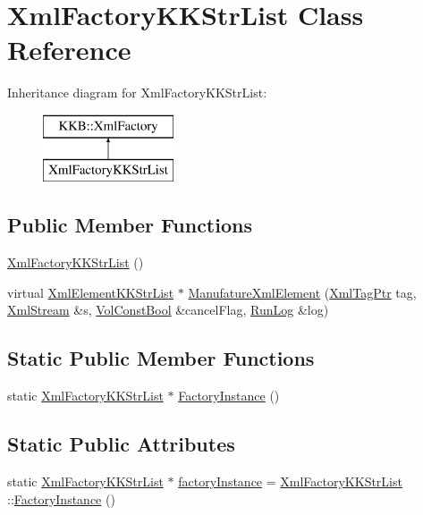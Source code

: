 \hypertarget{class_xml_factory_k_k_str_list}{}\section{Xml\+Factory\+K\+K\+Str\+List Class Reference}
\label{class_xml_factory_k_k_str_list}
Inheritance diagram for Xml\+Factory\+K\+K\+Str\+List\+:\begin{figure}[H]
\begin{center}
\leavevmode
\includegraphics[height=2.000000cm]{class_xml_factory_k_k_str_list}
\end{center}
\end{figure}
\subsection*{Public Member Functions}
\begin{DoxyCompactItemize}
\item 
\hyperlink{class_xml_factory_k_k_str_list_aac3ccf121c8bf683ca94dc3bd014f06f}{Xml\+Factory\+K\+K\+Str\+List} ()
\item 
virtual \hyperlink{namespace_k_k_b_a200e36b6739def59860c742eb8168484}{Xml\+Element\+K\+K\+Str\+List} $\ast$ \hyperlink{class_xml_factory_k_k_str_list_a39a3275bccfcde2cc5fb59047565eff1}{Manufature\+Xml\+Element} (\hyperlink{namespace_k_k_b_a9253a3ea8a5da18ca82be4ca2b390ef0}{Xml\+Tag\+Ptr} tag, \hyperlink{class_k_k_b_1_1_xml_stream}{Xml\+Stream} \&s, \hyperlink{namespace_k_k_b_a7d390f568e2831fb76b86b56c87bf92f}{Vol\+Const\+Bool} \&cancel\+Flag, \hyperlink{class_k_k_b_1_1_run_log}{Run\+Log} \&log)
\end{DoxyCompactItemize}
\subsection*{Static Public Member Functions}
\begin{DoxyCompactItemize}
\item 
static \hyperlink{class_xml_factory_k_k_str_list}{Xml\+Factory\+K\+K\+Str\+List} $\ast$ \hyperlink{class_xml_factory_k_k_str_list_a39d588d37da87b5015fa79a9c1594a97}{Factory\+Instance} ()
\end{DoxyCompactItemize}
\subsection*{Static Public Attributes}
\begin{DoxyCompactItemize}
\item 
static \hyperlink{class_xml_factory_k_k_str_list}{Xml\+Factory\+K\+K\+Str\+List} $\ast$ \hyperlink{class_xml_factory_k_k_str_list_a540d4889a7f249f6667fa46d9ff92145}{factory\+Instance} = \hyperlink{class_xml_factory_k_k_str_list}{Xml\+Factory\+K\+K\+Str\+List} \+::\hyperlink{class_xml_factory_k_k_str_list_a39d588d37da87b5015fa79a9c1594a97}{Factory\+Instance} ()
\end{DoxyCompactItemize}


